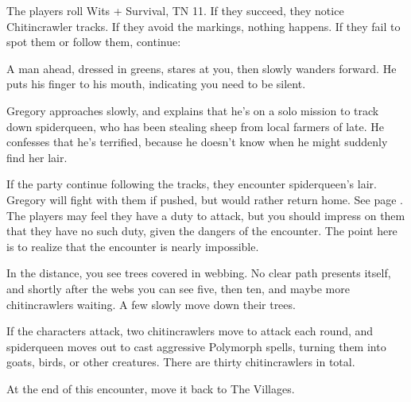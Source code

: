 \begin{multicols}{2}

The players roll Wits + Survival, TN 11.  If they succeed, they notice Chitincrawler tracks.  If they avoid the markings, nothing happens.  If they fail to spot them or follow them, continue:

\begin{boxtext}

	A man ahead, dressed in greens, stares at you, then slowly wanders forward.  He puts his finger to his mouth, indicating you need to be silent.

\end{boxtext}

Gregory approaches slowly, and explains that he's on a solo mission to track down \gls{spiderqueen}, who has been stealing sheep from local farmers of late.  He confesses that he's terrified, because he doesn't know when he might suddenly find her lair.

If the party continue following the tracks, they encounter \gls{spiderqueen}'s lair.  Gregory will fight with them if pushed, but would rather return home.  See page \pageref{spiderqueen}.  The players may feel they have a duty to attack, but you should impress on them that they have no such duty, given the dangers of the encounter.  The point here is to realize that the encounter is nearly impossible.

\begin{boxtext}
	In the distance, you see trees covered in webbing.  No clear path presents itself, and shortly after the webs you can see five, then ten, and maybe more chitincrawlers waiting.  A few slowly move down their trees.
\end{boxtext}

If the characters attack, two chitincrawlers move to attack each round, and \gls{spiderqueen} moves out to cast aggressive Polymorph spells, turning them into goats, birds, or other creatures.
There are thirty chitincrawlers in total.

At the end of this encounter, move it back to The Villages.


\humansoldier


\begin{boxtext}


\end{boxtext}
\end{multicols}
